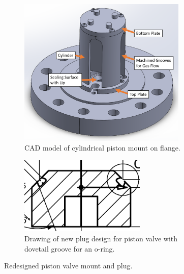 \begin{figure}[htbp]
    \centering
    \begin{subfigure}[t]{0.45\textwidth}
        \centering
        \includegraphics[width=0.88\textwidth]{design/photos/piston_mount_gen2_cad_labels.png}
        \caption{CAD model of cylindrical piston mount on flange.}
        \label{fig:cad mount 2}
    \end{subfigure}
    \hfill
    \begin{subfigure}[t]{0.45\textwidth}
        \centering
        \includegraphics[width=0.66\textwidth]{design/photos/new_plug_draw_crop.PNG}
        \caption{Drawing of new plug design for piston valve with dovetail groove for an o-ring.}
        \label{fig:plug v2 draw}
    \end{subfigure}
    
    \caption{Redesigned piston valve mount and plug.}
    \label{fig:redesign}
\end{figure}

